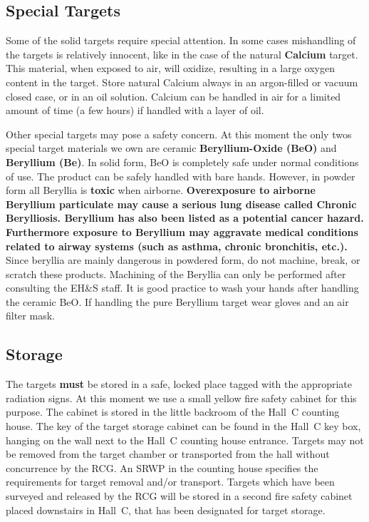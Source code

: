 {\subsection{Special Targets}

Some of the solid targets require special attention. In some cases
mishandling of the targets is relatively innocent, like in the case
of the natural {\bf Calcium} target. This material, when exposed to air,
will oxidize, resulting in a large oxygen content in the target.
Store natural Calcium always in an argon-filled or vacuum closed
case, or in an oil solution. Calcium can be handled in air for a limited
amount of time (a few hours) if handled with a layer of oil.

Other special targets may pose a safety concern. At this
moment the only twos special target materials we own are ceramic
{\bf Beryllium-Oxide (BeO)} and {\bf Beryllium (Be)}.
In solid form, BeO is completely safe under normal conditions of use.
The product can be safely handled with bare hands.
However, in powder form all Beryllia is {\bf toxic} when airborne.
{\bf Overexposure to airborne Beryllium particulate may cause a
serious lung disease called Chronic Berylliosis. Beryllium has also
been listed as a potential cancer hazard. Furthermore exposure to
Beryllium may aggravate medical conditions related to airway systems
(such as asthma, chronic bronchitis, etc.).}
Since beryllia are mainly dangerous in powdered form, do not machine,
break, or scratch these products. Machining of the Beryllia can only
be performed after consulting the EH\&S staff.
It is good practice to wash your
hands after handling the ceramic BeO. If handling the pure Beryllium
target wear gloves and an air filter mask.

\subsection{Storage}

The targets {\bf must} be stored in a safe, locked place tagged with the
appropriate radiation signs. At this moment we use a small yellow
fire safety cabinet for this purpose. The cabinet is stored in the
little backroom of the Hall~C counting house. The key of the target
storage cabinet can be found in the Hall~C key box, hanging on the
wall next to the Hall~C counting house entrance.
Targets may not be removed from the target chamber or transported from the hall without 
concurrence by the RCG.  An SRWP in the counting house specifies the requirements for 
target removal and/or transport.  Targets which have been surveyed and released by the 
RCG will be stored in a second fire safety cabinet placed downstairs in Hall~C,
that has been designated for target storage.

}

